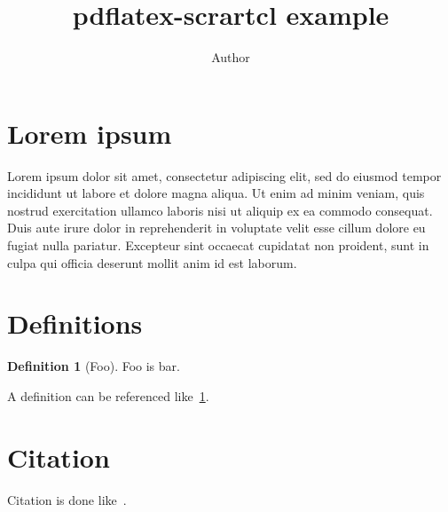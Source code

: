 \documentclass[pdftex,paper=a4]{scrartcl}
\title{pdflatex-scrartcl example}
\author{Author}
\theoremstyle{definition}
\newtheorem{definition}{Definition}[section]
\begin{document}
\maketitle

\section{Lorem ipsum}

Lorem ipsum dolor sit amet, consectetur adipiscing elit, sed do eiusmod tempor incididunt ut labore et dolore magna aliqua. Ut enim ad minim veniam, quis nostrud exercitation ullamco laboris nisi ut aliquip ex ea commodo consequat. Duis aute irure dolor in reprehenderit in voluptate velit esse cillum dolore eu fugiat nulla pariatur. Excepteur sint occaecat cupidatat non proident, sunt in culpa qui officia deserunt mollit anim id est laborum.

\section{Definitions}

\begin{definition}[Foo]\label{def:foo}
  Foo is bar.
\end{definition}

A definition can be referenced like~\cref{def:foo}.

\section{Citation}

Citation is done like~\cite{CWM1978}.



\end{document}
